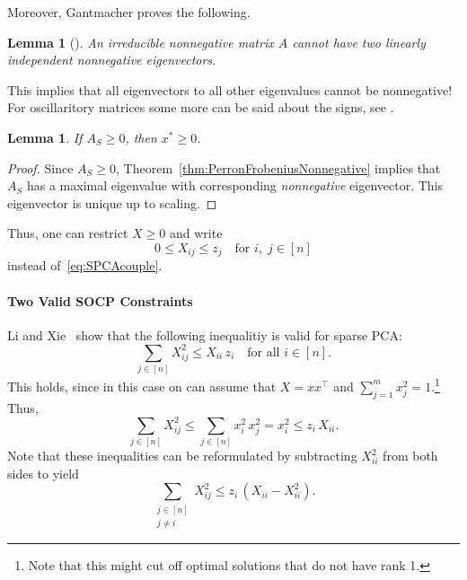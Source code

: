 \documentclass[10pt, a4paper]{article}
\newcommand{\T}{^{\top}}
\newtheorem{lemma}[theorem]{Lemma}
\begin{document}
Moreover, Gantmacher proves the following.
\begin{lemma}[{\cite[Chapter 2, Remark 3]{Gan59II}}]\label{lemma:PFNegative}
  An irreducible nonnegative matrix $A$ cannot have two linearly
  independent nonnegative eigenvectors.
\end{lemma}
This implies that all eigenvectors to all other eigenvalues cannot be nonnegative!
For oscillaritory matrices some more can be said about the signs, see
\cite[Chapter 2, Theorem~13]{Gan59II}.

\begin{lemma}
  If $A_S \geq 0$, then $x^* \geq 0$.
\end{lemma}

\begin{proof}
  Since $A_S \geq 0$, Theorem~\ref{thm:PerronFrobeniusNonnegative} implies
  that $A_S$ has a maximal eigenvalue with corresponding \emph{nonnegative}
  eigenvector. This eigenvector is unique up to scaling.
\end{proof}

Thus, one can restrict $X \geq 0$ and write
\[
  0 \leq X_{ij} \leq z_j \quad \text{for } i,\; j \in [n]
\]
instead of~\eqref{eq:SPCAcouple}.

\paragraph{Two Valid SOCP Constraints}

Li and Xie~\cite{LiX20} show that the following inequalitiy is valid for
sparse PCA:
\[
  \sum_{j \in [n]} X_{ij}^2 \leq X_{ii}\, z_i \quad\text{for all } i \in [n].
\]
This holds, since in this case on can assume that $X = x x\T$ and $\sum_{j=1}^m x_j^2 =
1$.\footnote{Note that this might cut off optimal solutions that do not
  have rank 1.} Thus,
\[
  \sum_{j \in [n]} X_{ij}^2 \leq \sum_{j \in [n]} x_i^2\, x_j^2 = x_i^2
  \leq z_i\, X_{ii}.
\]
Note that these inequalities can be reformulated by subtracting $X_{ii}^2$
from both sides to yield
\[
  \sum_{\substack{j \in [n]\\ j \neq i}} X_{ij}^2 \leq z_i\, (X_{ii} - X_{ii}^2).
\]
\end{document}
